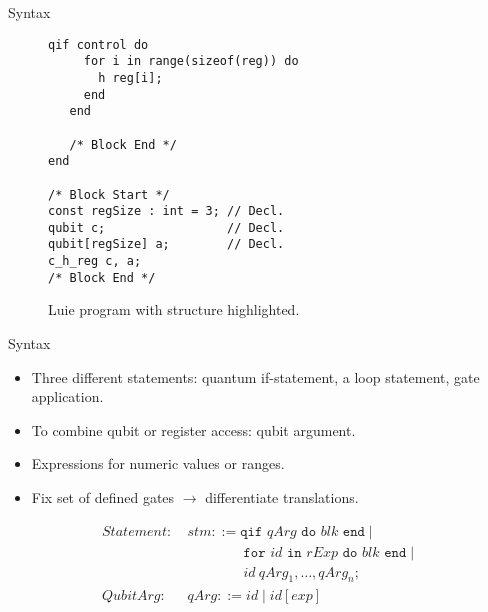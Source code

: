 \begin{frame}[fragile]{Syntax}
\begin{minipage}{.50\textwidth}
\begin{figure}[htp]
\begin{lstlisting}[style=Luie, basicstyle=\ttfamily\large]
   qif control do
     for i in range(sizeof(reg)) do
       h reg[i];  
     end
   end

   /* Block End */
end

/* Block Start */
const regSize : int = 3; // Decl.
qubit c;                 // Decl.
qubit[regSize] a;        // Decl.
c_h_reg c, a;           
/* Block End */
            \end{lstlisting}
            \caption{Luie program with structure highlighted.}
        \end{figure}
    \end{minipage}
\end{frame}


\newcommand{\adown}{\rotatebox[origin=c]{90}{$\Lsh$}}
\newcommand{\aup}{\rotatebox[origin=c]{90}{$\Rsh$}}
\begin{frame}[fragile]{Syntax}
    \begin{minipage}{.45\textwidth}
        \begin{itemize}
            \item Three different statements: quantum if-statement, a loop statement, gate application.
            \item To combine qubit or register access: qubit argument.
            \item Expressions for numeric values or ranges.
            \item Fix set of defined gates $\to$ differentiate translations.
        \end{itemize}
        \Large
        \begin{align*}
            Statement: \ & stm ::= \texttt{qif } qArg \texttt{ do }  blk \texttt{ end} \mid\\
            & \quad \quad \quad \quad \texttt{for } id \texttt{ in } rExp \texttt{ do } blk \texttt{ end} \mid \\
            & \quad \quad \quad \quad id \ qArg_1, \dots, qArg_n \texttt{;}\\
            QubitArg: \ & qArg ::= id \mid id[exp]\\
    \end{align*}
    \end{minipage}
    \begin{minipage}{.50\textwidth}

\end{minipage}
\end{frame}
